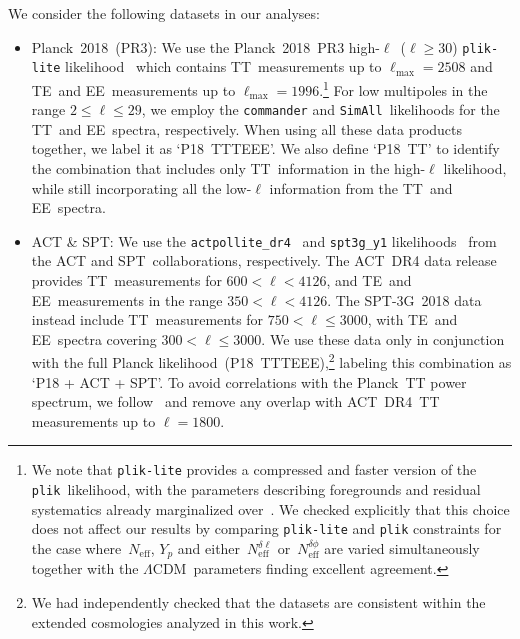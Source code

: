 \documentclass[11pt]{article}
\numberwithin{equation}{section}
\newcommand{\Neff}{N_\mathrm{eff}}
\newcommand{\Nphase}{N_\mathrm{eff}^{\delta\phi}}
\newcommand{\Nmultipole}{N_\mathrm{eff}^{\delta\ell}}
\begin{document}
We consider the following datasets in our analyses:
\begin{itemize}
	\item Planck~2018~(PR3): We use the Planck~2018~PR3 high-$\ell$~($\ell\geq 30$) \texttt{plik-lite} likelihood~\cite{Planck:2019nip} which contains TT~measurements up to $\ell_\mathrm{max}=2508$ and TE~and EE~measurements up to $\ell_\mathrm{max}=1996$.\footnote{We note that \texttt{plik-lite} provides a compressed and faster version of the \texttt{plik}~likelihood, with the parameters describing foregrounds and residual systematics already marginalized over~\cite{Planck:2019nip}. We checked explicitly that this choice does not affect our results by comparing \texttt{plik-lite} and \texttt{plik} constraints for the case where~$\Neff$, $Y_p$ and either~$\Nmultipole$ or~$\Nphase$ are varied simultaneously together with the $\Lambda$CDM~parameters finding excellent agreement.} For low multipoles in the range $2 \leq \ell \leq 29$, we employ the \texttt{commander} and \texttt{SimAll}~likelihoods for the TT~and EE~spectra, respectively. When using all these data products together, we label it as `P18~TTTEEE'. We also define `P18~TT' to identify the combination that includes only TT~information in the high-$\ell$ likelihood, while still incorporating all the low-$\ell$ information from the TT~and EE~spectra.
	
	\item ACT \& SPT: We use the \texttt{actpollite\_dr4}~\cite{ACT:2020frw} and \texttt{spt3g\_y1} likelihoods~\cite{SPT-3G:2022hvq} from the ACT and SPT~collaborations, respectively. The ACT~DR4 data release provides TT~measurements for $600 < \ell < 4126$, and TE~and EE~measurements in the range $350 < \ell < 4126$. The SPT-3G~2018 data instead include TT~measurements for $750 < \ell \leq 3000$, with TE~and EE~spectra covering $300 < \ell \leq 3000$. We use these data only in conjunction with the full Planck likelihood~(P18~TTTEEE),\footnote{We had independently checked that the datasets are consistent within the extended cosmologies analyzed in this work.} labeling this combination as `P18 + ACT + SPT'. To avoid correlations with the Planck~TT power spectrum, we follow~\cite{ACT:2020frw} and remove any overlap with ACT~DR4~TT measurements up to $\ell = 1800$.
	

\end{itemize}
\end{document}
